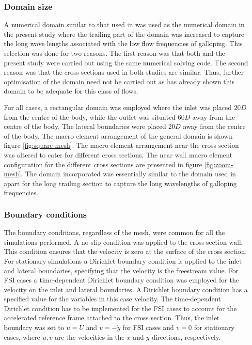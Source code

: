 \subsubsection{Domain size}

A numerical domain similar to that used in \citet{Leontini2013} was used  as the numerical domain in the present study where the trailing part of the domain was increased to capture the long wave lengths associated with the low flow frequencies of galloping. This selection was done for two reasons. The first reason was that both  \citet{Leontini2013} and the present study were carried out using the same numerical solving code. The second reason was that the cross sections used in both studies are similar. Thus, further optimisation of the domain need not be carried out as \citet{Leontini2013} has already shown this domain to be adequate for this class of flows.

For all cases, a rectangular domain was employed where the inlet was placed $20D$ from the centre of the body, while the outlet was situated $60D$ away from the centre of the body. The lateral boundaries were placed $20D$ away from the centre of the body. The macro element arrangement of the general domain is shown figure \ref{fig:square-mesh}. The macro element arrangement near the cross section was altered to cater for different cross sections. The near wall macro element configuration for the different cross sections are presented in figure \ref{fig:zoom-mesh}. The domain incorporated was essentially similar to the domain used in \citet{Leontini2013} apart for the long trailing section to capture the long wavelengths of galloping frequencies. 
 
 
 
 
 
 
 \subsubsection{Boundary conditions}
 
 The boundary conditions, regardless of the mesh, were common for all the simulations performed. A no-slip condition was applied to the cross section wall. This condition ensures that the velocity is zero at the surface of the cross section. For stationary simulations a Dirichlet boundary condition is applied to the inlet and lateral boundaries, specifying that the velocity is the freestream value. For FSI cases a time-dependent Dirichlet boundary condition was employed for the velocity on the inlet and lateral boundaries. A Dirichlet boundary condition has a specified value for the variables \citep{kreyszig2010} in this case velocity. The time-dependent Dirichlet condition has to be implemented for the FSI cases to account for the accelerated reference frame attached to the cross section. Thus, the inlet boundary was set to $u=U$ and $v=-\dot{y}$ for FSI cases and $v=0$ for stationary cases, where $u,v$ are the velocities in the $x$ and $y$ directions, respectively.
 
